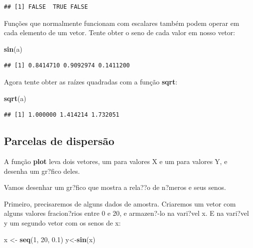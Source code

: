 \documentclass[]{book}
\newenvironment{Shaded}{\begin{snugshade}}{\end{snugshade}}
\newcommand{\DecValTok}[1]{\textcolor[rgb]{0.00,0.00,0.81}{#1}}
\newcommand{\FloatTok}[1]{\textcolor[rgb]{0.00,0.00,0.81}{#1}}
\newcommand{\KeywordTok}[1]{\textcolor[rgb]{0.13,0.29,0.53}{\textbf{#1}}}
\newcommand{\NormalTok}[1]{#1}
\newcommand{\StringTok}[1]{\textcolor[rgb]{0.31,0.60,0.02}{#1}}
\begin{document}
\begin{verbatim}
## [1] FALSE  TRUE FALSE
\end{verbatim}

Funções que normalmente funcionam com escalares também podem operar em cada elemento de um vetor. Tente obter o seno de cada valor em nosso vetor:

\begin{Shaded}
\begin{Highlighting}[]
\KeywordTok{sin}\NormalTok{(a)}
\end{Highlighting}
\end{Shaded}

\begin{verbatim}
## [1] 0.8414710 0.9092974 0.1411200
\end{verbatim}

Agora tente obter as raízes quadradas com a função \textbf{sqrt}:

\begin{Shaded}
\begin{Highlighting}[]
\KeywordTok{sqrt}\NormalTok{(a)}
\end{Highlighting}
\end{Shaded}

\begin{verbatim}
## [1] 1.000000 1.414214 1.732051
\end{verbatim}

\hypertarget{parcelas-de-dispersao}{%
\subsection{Parcelas de dispersão}\label{parcelas-de-dispersao}}

A função \textbf{plot} leva dois vetores, um para valores X e um para valores Y, e desenha um gr?fico deles.

Vamos desenhar um gr?fico que mostra a rela??o de n?meros e seus senos.

Primeiro, precisaremos de alguns dados de amostra. Criaremos um vetor com alguns valores fracion?rios entre 0 e 20, e armazen?-lo na vari?vel x. E na vari?vel y um segundo vetor com os senos de x:

\begin{Shaded}
\begin{Highlighting}[]
\NormalTok{x <-}\StringTok{ }\KeywordTok{seq}\NormalTok{(}\DecValTok{1}\NormalTok{, }\DecValTok{20}\NormalTok{, }\FloatTok{0.1}\NormalTok{)}
\NormalTok{y<-}\KeywordTok{sin}\NormalTok{(x)}
\end{Highlighting}
\end{Shaded}
\end{document}
